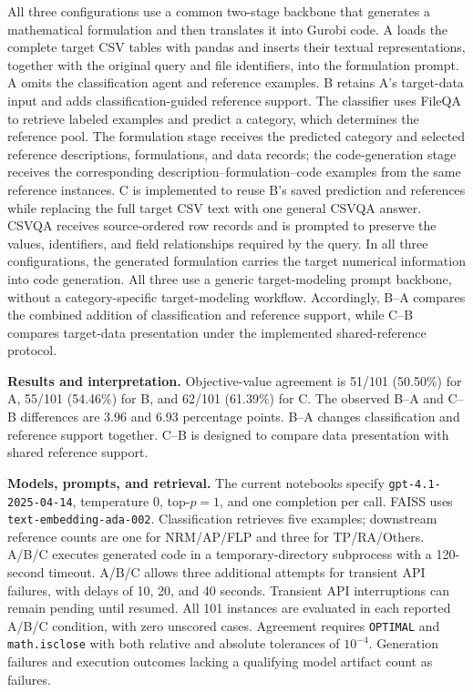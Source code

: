 \documentclass[11pt]{article}
\begin{document}
\begin{enumerate}[label=(AssoE.\arabic*),leftmargin=*]
\begin{enumerate}[label=(R1.Major.\arabic*),leftmargin=*]
All three configurations use a common two-stage backbone that generates a mathematical formulation and then translates it into Gurobi code. A loads the complete target CSV tables with pandas and inserts their textual representations, together with the original query and file identifiers, into the formulation prompt. A omits the classification agent and reference examples. B retains A's target-data input and adds classification-guided reference support. The classifier uses FileQA to retrieve labeled examples and predict a category, which determines the reference pool. The formulation stage receives the predicted category and selected reference descriptions, formulations, and data records; the code-generation stage receives the corresponding description--formulation--code examples from the same reference instances. C is implemented to reuse B's saved prediction and references while replacing the full target CSV text with one general CSVQA answer. CSVQA receives source-ordered row records and is prompted to preserve the values, identifiers, and field relationships required by the query. In all three configurations, the generated formulation carries the target numerical information into code generation. All three use a generic target-modeling prompt backbone, without a category-specific target-modeling workflow. Accordingly, B--A compares the combined addition of classification and reference support, while C--B compares target-data presentation under the implemented shared-reference protocol.


\textbf{Results and interpretation.}
Objective-value agreement is 51/101 (50.50\%) for A, 55/101 (54.46\%) for B, and 62/101 (61.39\%) for C. The observed B--A and C--B differences are 3.96 and 6.93 percentage points. B--A changes classification and reference support together. C--B is designed to compare data presentation with shared reference support. 

\textbf{Models, prompts, and retrieval.}
The current notebooks specify \nolinkurl{gpt-4.1-2025-04-14}, temperature $0$, top-$p=1$, and one completion per call. FAISS uses \nolinkurl{text-embedding-ada-002}. Classification retrieves five examples; downstream reference counts are one for NRM/AP/FLP and three for TP/RA/Others. A/B/C executes generated code in a temporary-directory subprocess with a 120-second timeout. A/B/C allows three additional attempts for transient API failures, with delays of 10, 20, and 40 seconds. Transient API interruptions can remain pending until resumed. All 101 instances are evaluated in each reported A/B/C condition, with zero unscored cases. Agreement requires \texttt{OPTIMAL} and \texttt{math.isclose} with both relative and absolute tolerances of $10^{-4}$. Generation failures and execution outcomes lacking a qualifying model artifact count as failures.



\end{enumerate}
\end{enumerate}
\end{document}
